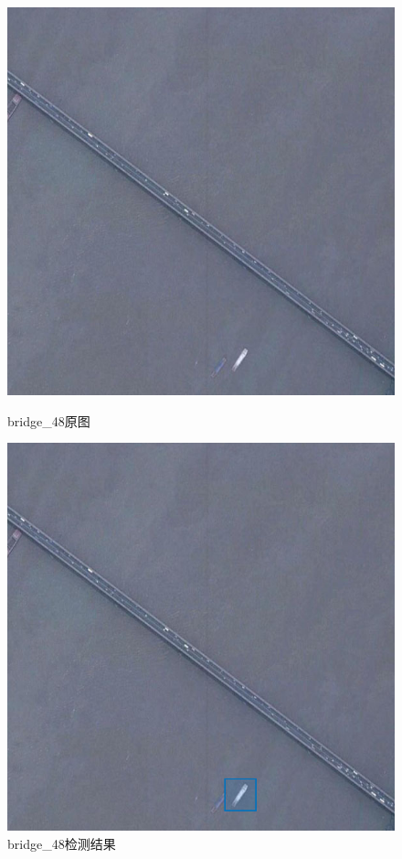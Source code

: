 \begin{figure}[H]
	\centering
	\begin{minipage}{0.45\linewidth}
		\includegraphics[width=\linewidth]{figure/bridge_48.jpg}
		\caption{bridge\_48原图}
	\end{minipage}
	\begin{minipage}{0.45\linewidth}
		\includegraphics[width=\linewidth]{figure/bridge_48_marked_ship.png}
		\caption{bridge\_48检测结果}
	\end{minipage}
\end{figure}
